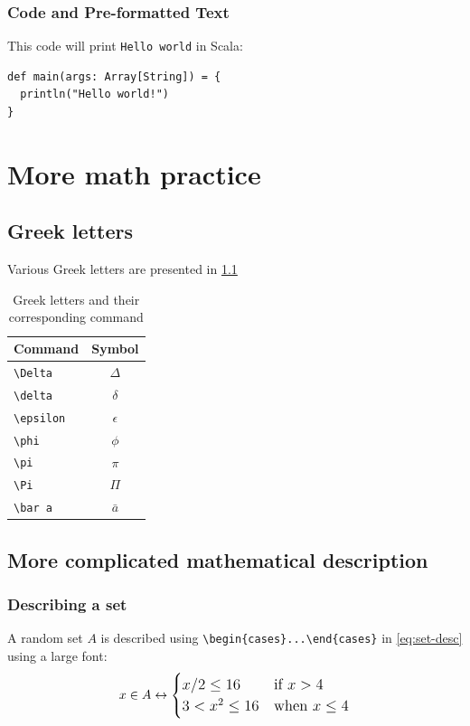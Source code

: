 \subsection{Code and Pre-formatted Text}
This code will print \verb!Hello world! in Scala:
\begin{verbatim}
def main(args: Array[String]) = {
  println("Hello world!")
}
\end{verbatim}

\chapter{More math practice}

\section{Greek letters}
Various Greek letters are presented in \cref{tab:greek-letters}

\begin{table}[h]
  \centering
  \begin{tabular}{lc}
    \toprule
    Command           & Symbol \\
    \midrule
    \verb!\Delta!     & $\Delta$ \\
    \verb!\delta!     & $\delta$ \\
    \verb!\epsilon!   & $\epsilon$ \\
    \verb!\phi!       & $\phi$ \\
    \verb!\pi!        & $\pi$ \\
    \verb!\Pi!        & $\Pi$ \\
    \verb!\bar a!     & $\bar a$ \\
    \bottomrule
  \end{tabular}
  \caption{Greek letters and their corresponding command}
  \label{tab:greek-letters}
\end{table}

\section{More complicated mathematical description}
\subsection{Describing a set}
A random set $A$ is described using \verb!\begin{cases}...\end{cases}! in \cref{eq:set-desc} using a large font:
\begin{equation}
  \large
  x \in A \leftrightarrow \begin{cases}
    x/2 \leq 16     &\mbox{if } x > 4 \\
    3 < x^2 \leq 16 &\mbox{when } x \leq 4 \\
  \end{cases}
  \label{eq:set-desc}
\end{equation}


